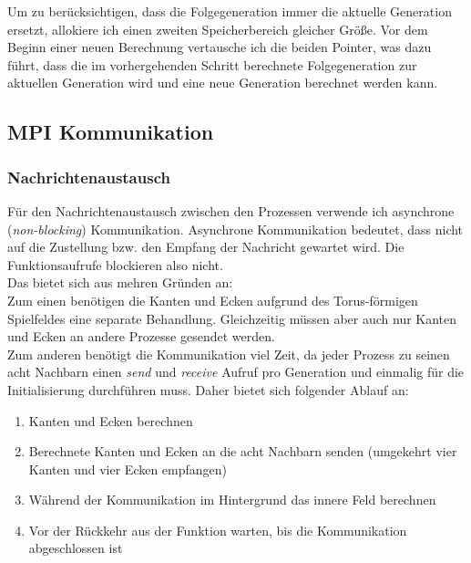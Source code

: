 \documentclass[german,plainarticle,hyperref,utf8]{zihpub}
\begin{document}
	Um zu berücksichtigen, dass die Folgegeneration immer die aktuelle Generation ersetzt, allokiere ich einen zweiten Speicherbereich gleicher Größe. Vor dem Beginn einer neuen Berechnung vertausche ich die beiden Pointer, was dazu führt, dass die im vorhergehenden Schritt berechnete Folgegeneration zur aktuellen Generation wird und eine neue Generation berechnet werden kann.
	\clearpage
	\subsection{MPI Kommunikation}
	\subsubsection{Nachrichtenaustausch} \label{message}
	Für den Nachrichtenaustausch zwischen den Prozessen verwende ich asynchrone (\textit{non-blocking}) Kommunikation. Asynchrone Kommunikation bedeutet, dass nicht auf die Zustellung bzw. den Empfang der Nachricht gewartet wird. Die Funktionsaufrufe blockieren also nicht.\\
	Das bietet sich aus mehren Gründen an:\\
	Zum einen benötigen die Kanten und Ecken aufgrund des Torus-förmigen Spielfeldes eine separate Behandlung. Gleichzeitig müssen aber auch nur Kanten und Ecken an andere Prozesse gesendet werden.\\
	Zum anderen benötigt die Kommunikation viel Zeit, da jeder Prozess zu seinen acht Nachbarn einen \textit{send} und \textit{receive} Aufruf pro Generation und einmalig für die Initialisierung durchführen muss.
	Daher bietet sich folgender Ablauf an:
	\begin{enumerate}
		\item Kanten und Ecken berechnen
		\item Berechnete Kanten und Ecken an die acht Nachbarn senden (umgekehrt vier Kanten und vier Ecken empfangen)
		\item Während der Kommunikation im Hintergrund das innere Feld berechnen
		\item Vor der Rückkehr aus der Funktion warten, bis die Kommunikation abgeschlossen ist
	\end{enumerate}
	
\end{document}
